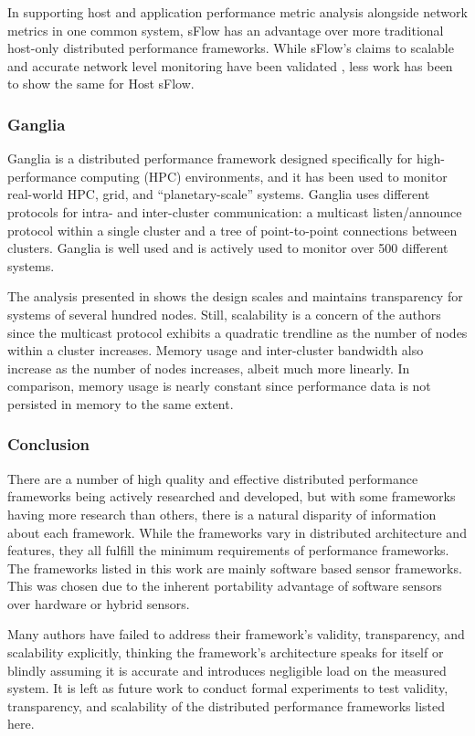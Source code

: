 In supporting host and application performance metric analysis alongside network metrics in one common system, sFlow has
an advantage over more traditional host-only distributed performance frameworks. While sFlow's claims to scalable and
accurate network level monitoring have been validated \cite{needed}, less work has been to show the same for Host sFlow.
\cite{needed}

\subsubsection{Ganglia}

Ganglia is a distributed performance framework designed specifically for high-performance computing (HPC) environments,
and it has been used to monitor real-world HPC, grid, and ``planetary-scale'' systems. Ganglia uses different protocols
for intra- and inter-cluster communication: a multicast listen/announce protocol within a single cluster and a tree of
point-to-point connections between clusters. Ganglia is well used and is actively used to monitor over 500 different
systems. \cite{ganglia}

The analysis presented in \cite{ganglia} shows the design scales and maintains transparency for systems of several
hundred nodes. Still, scalability is a concern of the authors since the multicast protocol exhibits a quadratic
trendline as the number of nodes within a cluster increases. Memory usage and inter-cluster bandwidth also increase as
the number of nodes increases, albeit much more linearly. In comparison, \dcamp memory usage is nearly constant since
performance data is not persisted in memory to the same extent.

\subsubsection{Conclusion}

There are a number of high quality and effective distributed performance frameworks being actively researched and
developed, but with some frameworks having more research than others, there is a natural disparity of information about
each framework. While the frameworks vary in distributed architecture and features, they all fulfill the minimum
requirements of performance frameworks. The frameworks listed in this work are mainly software based sensor frameworks.
This was chosen due to the inherent portability advantage of software sensors over hardware or hybrid sensors.

Many authors have failed to address their framework's validity, transparency, and scalability explicitly, thinking the
framework's architecture speaks for itself or blindly assuming it is accurate and introduces negligible load on the
measured system. It is left as future work to conduct formal experiments to test validity, transparency, and scalability
of the distributed performance frameworks listed here.
